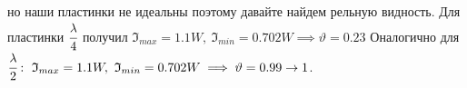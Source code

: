 но наши пластинки не идеальны поэтому давайте найдем рельную видность.
Для пластинки $\cfrac{\lambda}{4}$ получил 
$\mathfrak{I}_{max} = 1.1 W, \ \mathfrak{I}_{min} = 0.702 W \implies \vartheta = 0.23$
Оналогично для $\cfrac{\lambda}{2}: \ \mathfrak{I}_{max} = 1.1 W, \ 
\mathfrak{I}_{min} = 0.702 W \implies \vartheta = 0.99 \to 1$.











